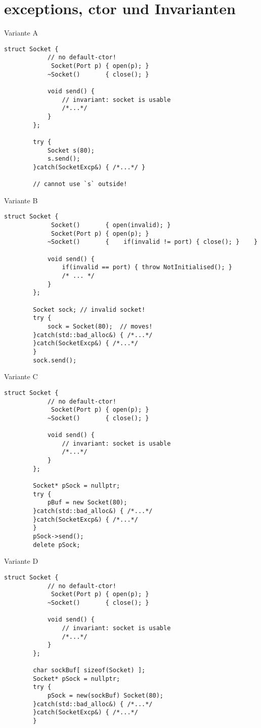 \section{exceptions, ctor und Invarianten}

\begin{frame}[t, fragile]{ Variante A }
	\begin{lstlisting}[basicstyle=\scriptsize]
		struct Socket {
			// no default-ctor!
			 Socket(Port p) { open(p); }
			~Socket()       { close(); }
			
			void send() {
				// invariant: socket is usable
				/*...*/
			}
		};
		
		try {
			Socket s(80);
			s.send();
		}catch(SocketExcp&) { /*...*/ }
		
		// cannot use `s` outside!
	\end{lstlisting}
\end{frame}

\begin{frame}[t, fragile]{ Variante B }
	\begin{lstlisting}[basicstyle=\scriptsize]
		struct Socket {
			 Socket()       { open(invalid); }
			 Socket(Port p) { open(p); }
			~Socket()       {    if(invalid != port) { close(); }    }
			
			void send() {
				if(invalid == port) { throw NotInitialised(); }
				/* ... */
			}
		};
		
		Socket sock; // invalid socket!
		try {
			sock = Socket(80);	// moves!
		}catch(std::bad_alloc&) { /*...*/
		}catch(SocketExcp&) { /*...*/
		}
		sock.send();
	\end{lstlisting}
\end{frame}

\begin{frame}[t, fragile]{ Variante C }
	\begin{lstlisting}[basicstyle=\scriptsize]
		struct Socket {
			// no default-ctor!
			 Socket(Port p) { open(p); }
			~Socket()       { close(); }
			
			void send() {
				// invariant: socket is usable
				/*...*/
			}
		};
		
		Socket* pSock = nullptr;
		try {
			pBuf = new Socket(80);
		}catch(std::bad_alloc&) { /*...*/
		}catch(SocketExcp&) { /*...*/
		}
		pSock->send();
		delete pSock;
	\end{lstlisting}
\end{frame}

\begin{frame}[t, fragile]{ Variante D }
	\begin{lstlisting}[basicstyle=\scriptsize]
		struct Socket {
			// no default-ctor!
			 Socket(Port p) { open(p); }
			~Socket()       { close(); }
			
			void send() {
				// invariant: socket is usable
				/*...*/
			}
		};
		
		char sockBuf[ sizeof(Socket) ];
		Socket* pSock = nullptr;
		try {
			pSock = new(sockBuf) Socket(80);
		}catch(std::bad_alloc&) { /*...*/
		}catch(SocketExcp&) { /*...*/
		}
		
	\end{lstlisting}
\end{frame}

